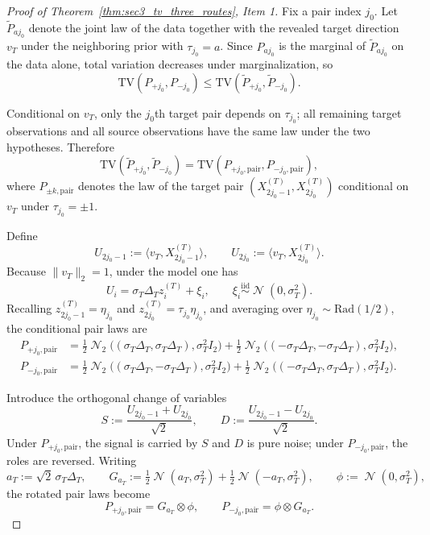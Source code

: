 \documentclass[10pt]{article}
\newcommand{\ip}[2]{\langle #1,#2\rangle}
\newcommand{\TV}{\mathrm{TV}}
\DeclareMathOperator{\dnorm}{\mathcal N}
\newcommand{\trg}{T}
\newcommand{\sigmaT}{\sigma_{\trg}}
\newcommand{\Xtar}{X^{(\trg)}}
\newcommand{\ztar}{z^{(\trg)}}
\newcommand{\DeltaT}{\Delta_{\trg}}
\begin{document}
\begin{proof}[Proof of Theorem~\ref{thm:sec3_tv_three_routes}, Item 1]
Fix a pair index $j_0$. Let $\widetilde P_{aj_0}$ denote the joint law of the
data together with the revealed target direction $v_{\trg}$ under the
neighboring prior with $\tau_{j_0}=a$. Since $P_{aj_0}$ is the marginal of
$\widetilde P_{aj_0}$ on the data alone, total variation decreases under
marginalization, so
\[
    \TV(P_{+j_0},P_{-j_0})
    \le
    \TV(\widetilde P_{+j_0},\widetilde P_{-j_0}).
\]

Conditional on $v_{\trg}$, only the $j_0$th target pair depends on $\tau_{j_0}$; all
remaining target observations and all source observations have the same law
under the two hypotheses. Therefore
\[
    \TV(\widetilde P_{+j_0},\widetilde P_{-j_0})
    =
    \TV(P_{+j_0,\mathrm{pair}},P_{-j_0,\mathrm{pair}}),
\]
where $P_{\pm k,\mathrm{pair}}$ denotes the law of the target
pair
$\left(
        \Xtar_{2j_0-1},
        \Xtar_{2j_0}
    \right)$
conditional on $v_{\trg}$ under $\tau_{j_0}=\pm1$.

Define
\[
    U_{2j_0-1}:=\ip{v_{\trg}}{\Xtar_{2j_0-1}},
    \qquad
    U_{2j_0}:=\ip{v_{\trg}}{\Xtar_{2j_0}}.
\]
Because $\|v_{\trg}\|_2=1$, under the model one has
\[
    U_i=\sigmaT\DeltaT \ztar_i+\xi_i,
    \qquad
    \xi_i\overset{\mathrm{iid}}{\sim}\dnorm(0,\sigmaT^2).
\]
Recalling $\ztar_{2j_0-1}=\eta_{j_0}$ and $\ztar_{2j_0}=\tau_{j_0}\eta_{j_0}$, and averaging
over $\eta_{j_0}\sim\mathrm{Rad}(1/2)$, the conditional pair laws are
\begin{align*}
    P_{+j_0,\mathrm{pair}}
    &=
    \tfrac12 \dnorm_2\bigl((\sigmaT\DeltaT,\sigmaT\DeltaT),\sigmaT^2 I_2\bigr)
    +
    \tfrac12 \dnorm_2\bigl((-\sigmaT\DeltaT,-\sigmaT\DeltaT),\sigmaT^2 I_2\bigr),\\
    P_{-j_0,\mathrm{pair}}
    &=
    \tfrac12 \dnorm_2\bigl((\sigmaT\DeltaT,-\sigmaT\DeltaT),\sigmaT^2 I_2\bigr)
    +
    \tfrac12 \dnorm_2\bigl((-\sigmaT\DeltaT,\sigmaT\DeltaT),\sigmaT^2 I_2\bigr).
\end{align*}

Introduce the orthogonal change of variables
\[
    S:=\frac{U_{2j_0-1}+U_{2j_0}}{\sqrt2},
    \qquad
    D:=\frac{U_{2j_0-1}-U_{2j_0}}{\sqrt2}.
\]
Under $P_{+j_0,\mathrm{pair}}$, the signal is carried by $S$ and $D$ is
pure noise; under $P_{-j_0,\mathrm{pair}}$, the roles are reversed. Writing
\[
    a_{\trg}:=\sqrt2\,\sigmaT\DeltaT,
    \qquad
    G_{a_{\trg}}:=\tfrac12 \dnorm(a_{\trg},\sigmaT^2)+\tfrac12 \dnorm(-a_{\trg},\sigmaT^2),
    \qquad
    \phi:=\dnorm(0,\sigmaT^2),
\]
the rotated pair laws become
\[
    P_{+j_0,\mathrm{pair}}=G_{a_{\trg}}\otimes \phi,
    \qquad
    P_{-j_0,\mathrm{pair}}=\phi\otimes G_{a_{\trg}}.
\]


\end{proof}
\end{document}
